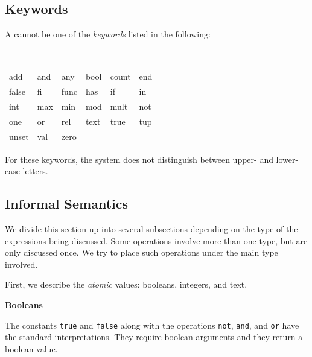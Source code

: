 \documentclass[a4,14pt,latin1]{article}
\begin{document}
\subsection{Keywords}
A  cannot be one of the {\em keywords\/} listed in the following:
{\tt
\begin{center}
\begin{tabular}{llllll}
add & and & any & bool & count & end\\
false & fi & func & has & if & in \\
int & max & min & mod & mult & not \\
one & or & rel & text & true & tup\\
unset & val & zero
\end{tabular}
\end{center}
}
For these keywords, the system does not distinguish between upper-
and lower-case letters.

\subsection{Informal Semantics}
We divide this section up into several subsections depending on the
type of the expressions being discussed. Some operations involve
more than one type, but are only discussed once. We try to place
such operations under the main type involved.

First, we describe the {\em atomic\/} values: booleans, integers, and text.

\vspace{2ex}
{\bf Booleans}

The constants {\tt true} and {\tt false} along with the operations
{\tt not}, {\tt and}, and {\tt or} have the standard interpretations.
They require boolean arguments and they return a boolean value.
\end{document}

